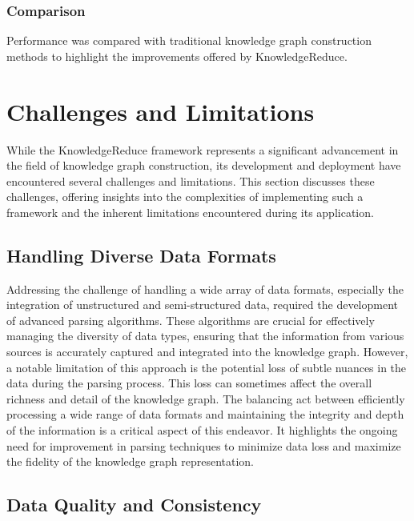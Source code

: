 \documentclass{article}
\begin{document}
\subsubsection{Comparison}
Performance was compared with traditional knowledge graph construction methods to highlight the improvements offered by KnowledgeReduce.

\section{Challenges and Limitations}

While the KnowledgeReduce framework represents a significant advancement in the field of knowledge graph construction, its development and deployment have encountered several challenges and limitations. This section discusses these challenges, offering insights into the complexities of implementing such a framework and the inherent limitations encountered during its application.

\subsection{Handling Diverse Data Formats}

Addressing the challenge of handling a wide array of data formats, especially the integration of unstructured and semi-structured data, required the development of advanced parsing algorithms. These algorithms are crucial for effectively managing the diversity of data types, ensuring that the information from various sources is accurately captured and integrated into the knowledge graph. However, a notable limitation of this approach is the potential loss of subtle nuances in the data during the parsing process. This loss can sometimes affect the overall richness and detail of the knowledge graph. The balancing act between efficiently processing a wide range of data formats and maintaining the integrity and depth of the information is a critical aspect of this endeavor. It highlights the ongoing need for improvement in parsing techniques to minimize data loss and maximize the fidelity of the knowledge graph representation.

\subsection{Data Quality and Consistency}
\end{document}
